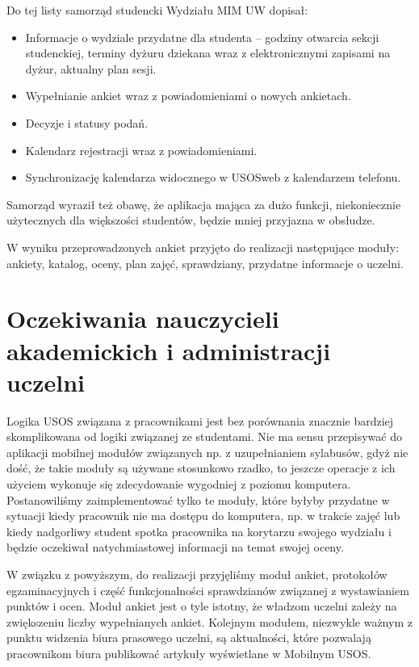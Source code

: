 \documentclass{pracamgr}
\begin{document}
Do tej listy samorząd studencki Wydziału MIM UW dopisał:

\begin{itemize}
	\item Informacje o wydziale przydatne dla studenta -- godziny otwarcia sekcji
	      studenckiej, terminy dyżuru dziekana wraz z elektronicznymi zapisami na
	      dyżur, aktualny plan sesji.
	\item Wypełnianie ankiet wraz z powiadomieniami o nowych ankietach.
	\item Decyzje i statusy podań.
	\item Kalendarz rejestracji wraz z powiadomieniami.
	\item Synchronizację kalendarza widocznego w USOSweb z kalendarzem telefonu.
\end{itemize}
Samorząd wyraził też obawę, że aplikacja mająca za dużo funkcji, niekoniecznie
użytecznych dla większości studentów, będzie mniej przyjazna w obsłudze.

W wyniku przeprowadzonych ankiet przyjęto do realizacji następujące moduły:
ankiety, katalog, oceny, plan zajęć, sprawdziany, przydatne informacje o uczelni.

\section{Oczekiwania nauczycieli akademickich i administracji uczelni}

Logika USOS związana z pracownikami jest bez porównania znacznie bardziej
skomplikowana od logiki związanej ze studentami. Nie ma sensu przepisywać do
aplikacji mobilnej modułów związanych np. z uzupełnianiem sylabusów, gdyż
nie dość, że takie moduły są używane stosunkowo rzadko, to jeszcze operacje
z ich użyciem wykonuje się zdecydowanie wygodniej z poziomu komputera. Postanowiliśmy
zaimplementować tylko te moduły, które byłyby przydatne w sytuacji kiedy pracownik
nie ma dostępu do komputera, np. w trakcie zajęć lub kiedy nadgorliwy student
spotka pracownika na korytarzu swojego wydziału i będzie oczekiwał natychmiastowej
informacji na temat swojej oceny.

W związku z powyższym, do realizacji przyjęliśmy moduł ankiet, protokołów
egzaminacyjnych i część funkcjonalności sprawdzianów związanej z wystawianiem
punktów i ocen. Moduł ankiet jest o tyle istotny, że władzom uczelni zależy na
zwiększeniu liczby wypełnianych ankiet. Kolejnym modułem, niezwykle ważnym z
punktu widzenia biura prasowego uczelni, są aktualności, które pozwalają pracownikom
biura publikować artykuły wyświetlane w Mobilnym USOS.
\end{document}
